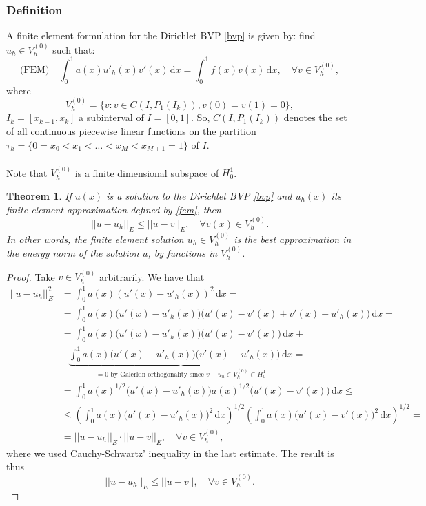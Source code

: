 \documentclass[12pt, a4paper]{article}
\newcommand{\rd}{\ensuremath{\mathrm{d}}}
\newcommand{\id}{\ensuremath{\,\rd}}
\newtheorem{theorem}{Theorem}[section]
\numberwithin{equation}{section}
\begin{document}
\subsubsection*{Definition}
A finite element formulation for the Dirichlet BVP \eqref{bvp} is given by: find $u_h\in V_h^{(0)}$ such that:
\begin{equation}
\label{fem}
\text{(FEM)}\quad \int_0^1 a(x)u'_h(x)v'(x)\id x = \int_0^1 f(x)v(x)\id x, \quad \forall v\in V_h^{(0)},
\end{equation}
where 
\begin{equation*}
V_h^{(0)} = \{ v : v\in C(I, P_1(I_k)), v(0)=v(1)=0 \},
\end{equation*}
$I_k = [x_{k-1}, x_{k}]$ a subinterval of $I=[0,1]$. So, $ C(I, P_1(I_k))$ denotes the set of all continuous piecewise linear functions on the partition $\tau_h = \{ 0 = x_0 < x_1 < \dots < x_M < x_{M+1} = 1\}$ of $I$.
\\\\
Note that $V_h^{(0)}$ is a finite dimensional subspace of $H_0^1$.
\\
\begin{theorem}
If $u(x)$ is a solution to the Dirichlet BVP \eqref{bvp} and $u_h(x)$ its finite element approximation defined by \eqref{fem}, then
\begin{equation}
\label{best}
||u-u_h||_E \leq ||u-v||_E, \quad \forall v(x)\in V_h^{(0)}.
\end{equation}
In other words, the finite element solution $u_h\in V_h^{(0)}$ is the best approximation in the energy norm of the solution $u$, by functions in $V_h^{(0)}$.
\end{theorem}
\begin{proof}
Take $v\in V_h^{(0)}$ arbitrarily. We have that
\begin{equation*}
\begin{split}
||u-u_h||^2_E &= \int_0^1 a(x)(u'(x)-u'_h(x))^2 \id x = \\
& = \int_0^1 a(x)\big (  u'(x)-u'_h(x) \big ) \big ( u'(x) - v'(x) + v'(x) - u'_h(x) \big )\id x = \\
&= \int_0^1 a(x)\big ( u'(x) -u'_h(x) \big )\big( u'(x) - v'(x) \big) \id x + \\
&+ \underbrace{\int_0^1 a(x) \big ( u'(x) - u'_h(x) \big ) \big ( v'(x) - u'_h(x) \big ) \id x}_{= 0 \text{ by Galerkin orthogonality since } v-u_h \in V_h^{(0)} \subset H_0^1} = \\
& = \int_0^1 a(x)^{1/2}\big ( u'(x) - u'_h(x) \big ) a(x)^{1/2}\big( u'(x) - v'(x) \big) \id x \leq \\
& \leq \left ( \int_0^1 a(x)\big ( u'(x)-u'_h(x) \big )^2\id x \right )^{1/2}\left ( \int_0^1 a(x)\big ( u'(x)-v'(x) \big )^2\id x \right )^{1/2} = \\
& = ||u-u_h||_E \cdot || u-v ||_E, \quad \forall v\in V_h^{(0)},
\end{split}
\end{equation*}
where we used Cauchy-Schwartz' inequality in the last estimate. The result is thus
\begin{equation*}
||u-u_h||_E \leq ||u-v||, \quad \forall v\in V_h^{(0)}.
\end{equation*}
\end{proof}
\end{document}
